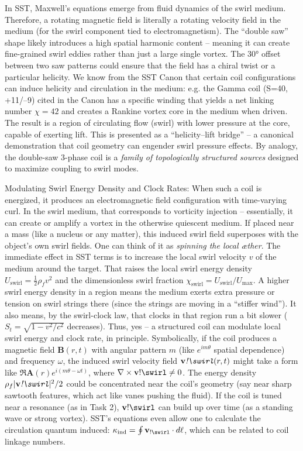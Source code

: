 \documentclass[11pt]{article}
\begin{document}
In SST, Maxwell’s equations emerge from fluid dynamics of the swirl medium. Therefore, a rotating magnetic field is literally a rotating velocity field in the medium (for the swirl component tied to electromagnetism). The “double saw” shape likely introduces a high spatial harmonic content – meaning it can create fine-grained swirl eddies rather than just a large single vortex. The 30° offset between two saw patterns could ensure that the field has a chiral twist or a particular helicity. We know from the SST Canon that certain coil configurations can induce helicity and circulation in the medium: e.g. the Gamma coil (S=40, +11/–9) cited in the Canon has a specific winding that yields a net linking number $\chi=42$ and creates a Rankine vortex core in the medium when driven. The result is a region of circulating flow (swirl) with lower pressure at the core, capable of exerting lift. This is presented as a “helicity–lift bridge” – a canonical demonstration that coil geometry can engender swirl pressure effects. By analogy, the double-saw 3-phase coil is a \textit{family of topologically structured sources} designed to maximize coupling to swirl modes.


Modulating Swirl Energy Density and Clock Rates: When such a coil is energized, it produces an electromagnetic field configuration with time-varying curl. In the swirl medium, that corresponds to vorticity injection – essentially, it can create or amplify a vortex in the otherwise quiescent medium. If placed near a mass (like a nucleus or any matter), this induced swirl field superposes with the object’s own swirl fields. One can think of it as \textit{spinning the local æther}. The immediate effect in SST terms is to increase the local swirl velocity $v$ of the medium around the target. That raises the local swirl energy density $U_{\text{swirl}}=\tfrac{1}{2}\rho_f v^2$ and the dimensionless swirl fraction $\chi_{\text{swirl}} = U_{\text{swirl}}/U_{\max}$. A higher swirl energy density in a region means the medium exerts extra pressure or tension on swirl strings there (since the strings are moving in a “stiffer wind”). It also means, by the swirl-clock law, that clocks in that region run a bit slower ($S_{t}=\sqrt{1-v^2/c^2}$ decreases). Thus, yes – a structured coil can modulate local swirl energy and clock rate, in principle. Symbolically, if the coil produces a magnetic field $\mathbf{B}(r,t)$ with angular pattern $m$ (like $e^{im\theta}$ spatial dependence) and frequency $\omega$, the induced swirl velocity field $\mathbf{v}\textit{!\swirl}(r,t)$ might take a form like $\Re{\mathbf{A}(r) e^{i(m\theta - \omega t)}}$, where $\nabla\times \mathbf{v}{!\swirl}\neq0$. The energy density $\rho_f |\mathbf{v}\textit{!\swirl}|^2/2$ could be concentrated near the coil’s geometry (say near sharp sawtooth features, which act like vanes pushing the fluid). If the coil is tuned near a resonance (as in Task 2), $\mathbf{v}{!\swirl}$ can build up over time (as a standing wave or strong vortex). SST’s equations even allow one to calculate the circulation quantum induced: $\kappa_{\text{ind}} = \oint \mathbf{v}_{!\swirl}\cdot d\ell$, which can be related to coil linkage numbers.
\end{document}
